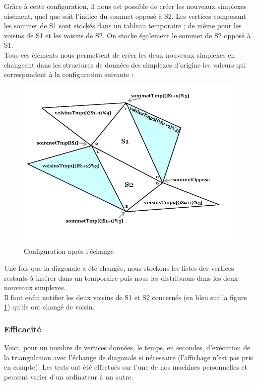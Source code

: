 \documentclass{article}
\begin{document}
        Grâce à cette configuration, il nous est possible de créer les nouveaux simplexes aisément, quel que soit l'indice du sommet opposé à S2. Les vertices composant les sommet de S1 sont stockés dans un tableau temporaire ; de même pour les voisins de S1 et les voisins de S2. On stocke également le sommet de S2 opposé à S1.
        \\Tous ces éléments nous permettent de créer les deux nouveaux simplexes en changeant dans les structures de données des simplexes d'origine les valeurs qui correspondent à la configuration suivante :
        
        \begin{figure}[H]
            \centering
            \includegraphics[scale=0.40]{config_apres_swap.jpg}     
            \caption{Configuration après l'échange}
            \label{fig3}
        \end{figure}
        
        Une fois que la diagonale a été changée, nous stockons les listes des vertices restants à insérer dans un temporaire puis nous les distribuons dans les deux nouveaux simplexes. 
        \\Il faut enfin notifier les deux voisins de S1 et S2 concernés (en bleu sur la figure \ref{fig3}) qu'ils ont changé de voisin.
        
        \subsubsection{Efficacité}
        
        Voici, pour un nombre de vertices données, le temps, en secondes, d'exécution de la triangulation avec l'échange de diagonale si nécessaire (l'affichage n'est pas pris en compte). Les tests ont été effectués sur l'une de nos machines personnelles et peuvent varier d'un ordinateur à un autre.
        
\end{document}
